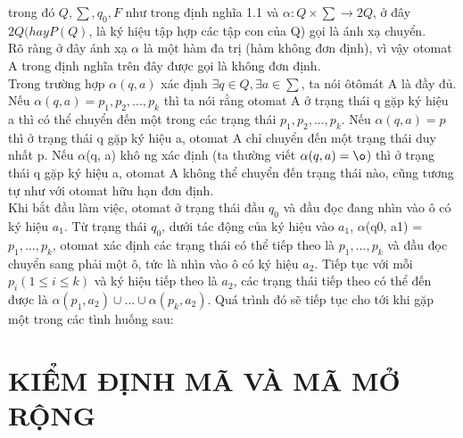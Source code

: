 \begin{flushleft}
trong đó $Q, \sum, q_0, F$ như trong định nghĩa 1.1 và $\alpha: Q \times \sum \to 2Q$, ở đây $2Q (hay P(Q)$, là ký hiệu tập hợp các tập con của Q) gọi là ánh xạ chuyển.\\
Rõ ràng ở đây ánh xạ $\alpha$ là một hàm đa trị (hàm không đơn định), vì vậy otomat A trong định nghĩa trên đây được gọi là không đơn định.\\
Trong trường hợp $\alpha(q, a)$ xác định $\exists q \in Q, \exists a \in \sum$, ta nói ôtômát A là đầy đủ.\\
\hspace{10mm}Nếu $\alpha(q, a) = {p_1, p_2,..., p_k}$ thì ta nói rằng otomat A ở trạng thái q gặp ký hiệu a thì có thể chuyển đến một trong các trạng thái $p_1, p_2,..., p_k$. Nếu $\alpha(q, a) = {p}$ thì ở trạng thái q gặp ký hiệu a, otomat A chỉ chuyển đến một trạng thái duy nhất p. Nếu $\alpha$(q, a) khô ng xác định (ta thường viết $\alpha(q, a) = \o $) thì ở trạng thái q gặp ký hiệu a, otomat A không thể chuyển đến trạng thái nào, cũng tương tự như với otomat hữu hạn đơn định.\\
\hspace{10mm}Khi bắt đầu làm việc, otomat ở trạng thái đầu $q_0$ và đầu đọc đang nhìn vào ô có ký hiệu $a_1$. Từ trạng thái $q_0$, dưới tác động của ký hiệu vào $a_1$, $\alpha$(q0, a1) = {$p_1,..., p_k$}, otomat xác định các trạng thái có thể tiếp theo là $p_1,..., p_k$ và đầu đọc chuyển sang phải một ô, tức là nhìn vào ô có ký hiệu $a_2$. Tiếp tục với mỗi $p_i (1 \le i \le k)$ và ký hiệu tiếp theo là $a_2$, các trạng thái tiếp theo có thể đến được là $\alpha(p_1, a_2)\cup...\cup \alpha(p_k, a_2)$. Quá trình đó sẽ tiếp tục cho tới khi gặp một trong các tình huống sau:\\

\end{flushleft}
\chapter{KIỂM ĐỊNH MÃ VÀ MÃ MỞ RỘNG}

